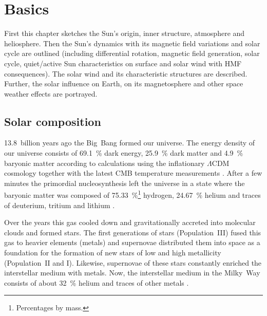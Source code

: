 \chapter{Basics}
\label{chap:basics}

First this chapter sketches the Sun's origin, inner structure, atmosphere and heliosphere. Then the Sun's dynamics with its magnetic field variations and solar cycle are outlined (including differential rotation, magnetic field generation, solar cycle, quiet/active Sun characteristics on surface and solar wind with HMF consequences). The solar wind and its characteristic structures are described. Further, the solar influence on Earth, on its magnetosphere and other space weather effects are portrayed.\\


\section{Solar composition}
\label{sec:solar_composition}

13.8~billion years ago the Big~Bang formed our universe. The energy density of our universe consists of \SI{69.1}{\percent} dark energy, \SI{25.9}{\percent} dark matter and \SI{4.9}{\percent} baryonic matter according to calculations using the inflationary $\Lambda$CDM cosmology together with the latest CMB temperature measurements \citep{Planck2016}.
After a few minutes the primordial nucleosynthesis left the universe in a state where the baryonic matter was composed of \SI{75.33}{\percent}\footnote{Percentages by mass.} hydrogen, \SI{24.67}{\percent} helium and traces of deuterium, tritium and lithium \citep{Planck2016}.

Over the years this gas cooled down and gravitationally accreted into molecular clouds and formed stars. The first generations of stars (Population~III) fused this gas to heavier elements (metals) and supernovae distributed them into space as a foundation for the formation of new stars of low and high metallicity (Population~II and I). Likewise, supernovae of these stars constantly enriched the interstellar medium with metals. Now, the interstellar medium in the Milky~Way consists of about \SI{32}{\percent} helium and traces of other metals \citep{Danziger1970}.\\

